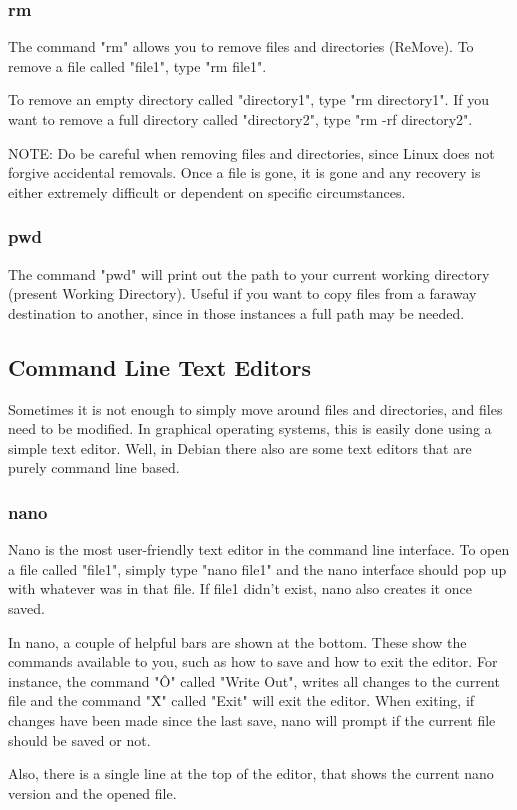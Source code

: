 \documentclass[12pt,article]{memoir}
\begin{document}
\subsubsection{rm}
The command "rm" allows you to remove files and directories (ReMove). To remove a file called "file1", type "rm file1".\par
To remove an empty directory called "directory1", type "rm directory1". If you want to remove a full directory called "directory2", type "rm -rf directory2".\par
NOTE: Do be careful when removing files and directories, since Linux does not forgive accidental removals. Once a file is gone, it is gone and any recovery is either extremely difficult or dependent on specific circumstances.

\subsubsection{pwd}
The command "pwd" will print out the path to your current working directory (present Working Directory). Useful if you want to copy files from a faraway destination to another, since in those instances a full path may be needed.

\newpage
\subsection{Command Line Text Editors}
Sometimes it is not enough to simply move around files and directories, and files need to be modified. In graphical operating systems, this is easily done using a simple text editor. Well, in Debian there also are some text editors that are purely command line based.

\subsubsection{nano}
Nano is the most user-friendly text editor in the command line interface. To open a file called "file1", simply type "nano file1" and the nano interface should pop up with whatever was in that file. If file1 didn't exist, nano also creates it once saved.\par
In nano, a couple of helpful bars are shown at the bottom. These show the commands available to you, such as how to save and how to exit the editor. For instance, the command "\^O" called "Write Out", writes all changes to the current file and the command "\^X" called "Exit" will exit the editor. When exiting, if changes have been made since the last save, nano will prompt if the current file should be saved or not.\par
Also, there is a single line at the top of the editor, that shows the current nano version and the opened file.
\end{document}
